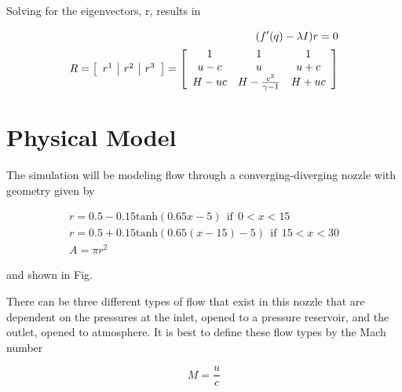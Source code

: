 \documentclass{article}%
\numberwithin{equation}{section}
\begin{document}
Solving for the eigenvectors, r, results in

\begin{equation}
\begin{split}
(f'(q) - \lambda I) r = 0 \\
R = \left[ \begin{array}{c |c | c} r^1 & r^2 & r^3 \end{array} \right]= \left[ \begin{array}{ccc} 1 & 1 & 1 \\ u- c & u  & u + c \\ H - u c &  H - \frac{c^2}{\gamma - 1} & H + u c   \end{array} \right] 
\end{split}
\end{equation}

\section{Physical Model}
The simulation will be modeling flow through a converging-diverging nozzle with geometry given by

\begin{equation}
\begin{split}
r = 0.5 - 0.15 \text{tanh}(0.65x - 5) \ \ \text{if} \ \ 0 < x < 15 \\
r = 0.5 + 0.15 \text{tanh}(0.65(x - 15) - 5) \ \ \text{if} \ \ 15 < x < 30 \\
A = \pi r^2
\end{split}
\end{equation}

and shown in Fig. 

There can be three different types of flow that exist in this nozzle that are dependent on the pressures at the inlet, opened to a pressure reservoir, and the outlet, opened to atmosphere. It is best to define these flow types by the Mach number

\begin{equation}
M = \frac{u}{c}
\end{equation} 
\end{document}
